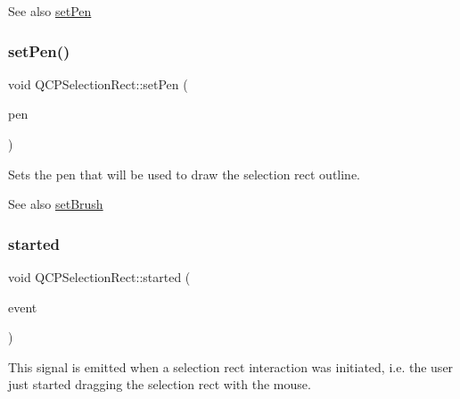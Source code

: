 \begin{DoxySeeAlso}{See also}
\hyperlink{class_q_c_p_selection_rect_ada20b7fb1b2dcbe50523262636b06963}{set\+Pen} 
\end{DoxySeeAlso}
\mbox{\label{class_q_c_p_selection_rect_ada20b7fb1b2dcbe50523262636b06963}} 
\subsubsection{\texorpdfstring{set\+Pen()}{setPen()}}
{\footnotesize\ttfamily void Q\+C\+P\+Selection\+Rect\+::set\+Pen (\begin{DoxyParamCaption}\item[{const Q\+Pen \&}]{pen }\end{DoxyParamCaption})}

Sets the pen that will be used to draw the selection rect outline.

\begin{DoxySeeAlso}{See also}
\hyperlink{class_q_c_p_selection_rect_ab0c66f1484418782efa01f4153611080}{set\+Brush} 
\end{DoxySeeAlso}
\mbox{\label{class_q_c_p_selection_rect_a7b7162d19f4f2174d3644ff1a5d335aa}} 
\subsubsection{\texorpdfstring{started}{started}}
{\footnotesize\ttfamily void Q\+C\+P\+Selection\+Rect\+::started (\begin{DoxyParamCaption}\item[{Q\+Mouse\+Event $\ast$}]{event }\end{DoxyParamCaption})\hspace{0.3cm}{\ttfamily [signal]}}

This signal is emitted when a selection rect interaction was initiated, i.\+e. the user just started dragging the selection rect with the mouse. \mbox{\label{class_q_c_p_selection_rect_a271f24cfca8bc50a0e2b4310ff90e227}} 
